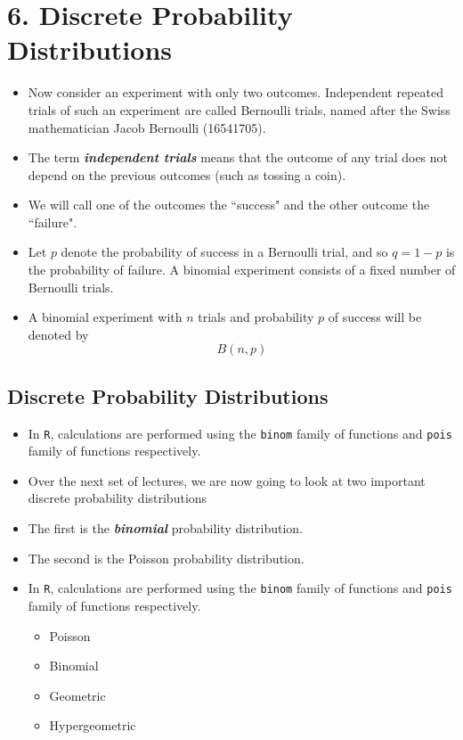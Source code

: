 \documentclass[]{report}
\begin{document}

\chapter{6. Discrete Probability Distributions}

{
\begin{itemize}
\item  Now consider an experiment with only two outcomes. Independent repeated trials of such an experiment are
called Bernoulli trials, named after the Swiss mathematician Jacob Bernoulli (16541705). \item  The term \textbf{\emph{independent
trials}} means that the outcome of any trial does not depend on the previous outcomes (such as tossing a coin).
\item  We will call one of the outcomes the ``success" and the other outcome the ``failure".
\item 
Let $p$ denote the probability of success in a Bernoulli trial, and so $q = 1 - p$ is the probability of failure.
A binomial experiment consists of a fixed number of Bernoulli trials. \item  A binomial experiment with $n$ trials and
probability $p$ of success will be denoted by
\[B(n, p)\]
\end{itemize}
}


\section{Discrete Probability Distributions}
\begin{itemize}

\item In \texttt{R}, calculations are performed using the \texttt{binom} family of functions and \texttt{pois} family of functions respectively.

\item Over the next set of lectures, we are now going to look at two important discrete probability distributions

\item The first is the \textbf{\emph{binomial}} probability distribution.

\item The second is the Poisson probability distribution.

\item In \texttt{R}, calculations are performed using the \texttt{binom} family of functions and \texttt{pois} family of functions respectively.
\begin{itemize}
\item Poisson
\item Binomial
\item Geometric
\item Hypergeometric 
\end{itemize}
\end{itemize}
\end{document}
